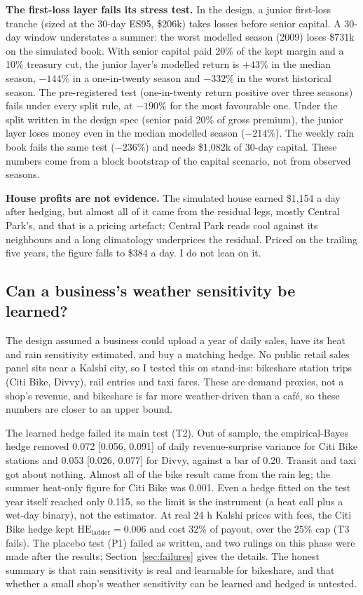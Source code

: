 \documentclass[11pt]{article}
\newcommand{\HElad}{\mathrm{HE}_{\mathrm{ladder}}}
\begin{document}
\textbf{The first-loss layer fails its stress test.} In the design, a junior first-loss tranche (sized at the 30-day ES95, \$206k) takes losses before senior capital. A 30-day window understates a summer: the worst modelled season (2009) loses \$731k on the simulated book. With senior capital paid 20\% of the kept margin and a 10\% treasury cut, the junior layer's modelled return is $+43\%$ in the median season, $-144\%$ in a one-in-twenty season and $-332\%$ in the worst historical season. The pre-registered test (one-in-twenty return positive over three seasons) fails under every split rule, at $-190\%$ for the most favourable one. Under the split written in the design spec (senior paid 20\% of gross premium), the junior layer loses money even in the median modelled season ($-214\%$). The weekly rain book fails the same test ($-236\%$) and needs \$1,082k of 30-day capital. These numbers come from a block bootstrap of the capital scenario, not from observed seasons.

\textbf{House profits are not evidence.} The simulated house earned \$1,154 a day after hedging, but almost all of it came from the residual legs, mostly Central Park's, and that is a pricing artefact: Central Park reads cool against its neighbours and a long climatology underprices the residual. Priced on the trailing five years, the figure falls to \$384 a day. I do not lean on it.

\subsection{Can a business's weather sensitivity be learned?}
\label{sec:learn}

The design assumed a business could upload a year of daily sales, have its heat and rain sensitivity estimated, and buy a matching hedge. No public retail sales panel sits near a Kalshi city, so I tested this on stand-ins: bikeshare station trips (Citi Bike, Divvy), rail entries and taxi fares. These are demand proxies, not a shop's revenue, and bikeshare is far more weather-driven than a café, so these numbers are closer to an upper bound.

The learned hedge failed its main test (T2). Out of sample, the empirical-Bayes hedge removed 0.072 [0.056, 0.091] of daily revenue-surprise variance for Citi Bike stations and 0.053 [0.026, 0.077] for Divvy, against a bar of 0.20. Transit and taxi got about nothing. Almost all of the bike result came from the rain leg; the summer heat-only figure for Citi Bike was 0.001. Even a hedge fitted on the test year itself reached only 0.115, so the limit is the instrument (a heat call plus a wet-day binary), not the estimator. At real 24 h Kalshi prices with fees, the Citi Bike hedge kept $\HElad = 0.006$ and cost 32\% of payout, over the 25\% cap (T3 fails). The placebo test (P1) failed as written, and two rulings on this phase were made after the results; Section~\ref{sec:failures} gives the details. The honest summary is that rain sensitivity is real and learnable for bikeshare, and that whether a small shop's weather sensitivity can be learned and hedged is untested.
\end{document}
